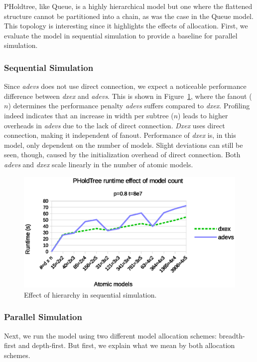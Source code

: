 PHoldtree, like Queue, is a highly hierarchical model but one where the flattened structure cannot be partitioned into a chain, as was the case in the Queue model.
This topology is interesting since it highlights the effects of allocation.
First, we evaluate the model in sequential simulation to provide a baseline for parallel simulation.

\subsubsection{Sequential Simulation}
Since \textit{adevs} does not use direct connection, we expect a noticeable performance difference between \textit{dxex} and \textit{adevs}.
This is shown in Figure~\ref{fig:PHOLDtree_seq_dn_benchmark}, where the fanout ($n$) determines the performance penalty \textit{adevs} suffers compared to \textit{dxex}.
Profiling indeed indicates that an increase in width per subtree ($n$) leads to higher overheads in \textit{adevs} due to the lack of direct connection.
\textit{Dxex} uses direct connection, making it independent of fanout.
Performance of \textit{dxex} is, in this model, only dependent on the number of models.
Slight deviations can still be seen, though, caused by the initialization overhead of direct connection.
Both \textit{adevs} and \textit{dxex} scale linearly in the number of atomic models.

\begin{figure}
    \center
    \includegraphics[width=\columnwidth]{fig/pholdtree_sequential_dn.eps}
    \caption{Effect of hierarchy in sequential simulation.}
    \label{fig:PHOLDtree_seq_dn_benchmark}
\end{figure}

\subsubsection{Parallel Simulation}
Next, we run the model using two different model allocation schemes: breadth-first and depth-first.
But first, we explain what we mean by both allocation schemes.

